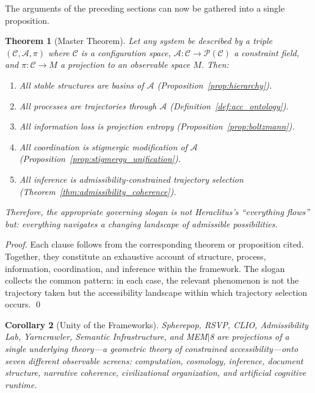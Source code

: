\documentclass[12pt, a4paper, twoside]{article}
\theoremstyle{plain}
\newtheorem{theorem}{Theorem}[section]
\newtheorem{corollary}[theorem]{Corollary}
\theoremstyle{definition}
\theoremstyle{remark}
\newcommand{\Acc}{\mathcal{A}}
\newcommand{\Conf}{\mathcal{C}}
\newcommand{\Proj}{\pi}
\begin{document}
The arguments of the preceding sections can now be gathered into a single
proposition.

\begin{theorem}[Master Theorem]
\label{thm:master}
Let any system be described by a triple $(\Conf, \Acc, \Proj)$ where $\Conf$
is a configuration space, $\Acc: \Conf \to \mathcal{P}(\Conf)$ a constraint
field, and $\Proj: \Conf \to M$ a projection to an observable space $M$. Then:
\begin{enumerate}[label=(\roman*)]
  \item All stable structures are basins of $\Acc$
    (Proposition~\ref{prop:hierarchy}).
  \item All processes are trajectories through $\Acc$
    (Definition~\ref{def:acc_ontology}).
  \item All information loss is projection entropy
    (Proposition~\ref{prop:boltzmann}).
  \item All coordination is stigmergic modification of $\Acc$
    (Proposition~\ref{prop:stigmergy_unification}).
  \item All inference is admissibility-constrained trajectory selection
    (Theorem~\ref{thm:admissibility_coherence}).
\end{enumerate}
Therefore, the appropriate governing slogan is not Heraclitus's
\emph{``everything flows''} but: \emph{everything navigates a changing
landscape of admissible possibilities.}
\end{theorem}

\begin{proof}
Each clause follows from the corresponding theorem or proposition cited.
Together, they constitute an exhaustive account of structure, process,
information, coordination, and inference within the framework. The slogan
collects the common pattern: in each case, the relevant phenomenon is not
the trajectory taken but the accessibility landscape within which trajectory
selection occurs.
\qed
\end{proof}

\begin{corollary}[Unity of the Frameworks]
Spherepop, RSVP, CLIO, Admissibility Lab, Yarncrawler, Semantic
Infrastructure, and MEM$|$8 are projections of a single underlying theory---a
geometric theory of constrained accessibility---onto seven different observable
screens: computation, cosmology, inference, document structure, narrative
coherence, civilizational organization, and artificial cognitive runtime.
\end{corollary}
\end{document}
